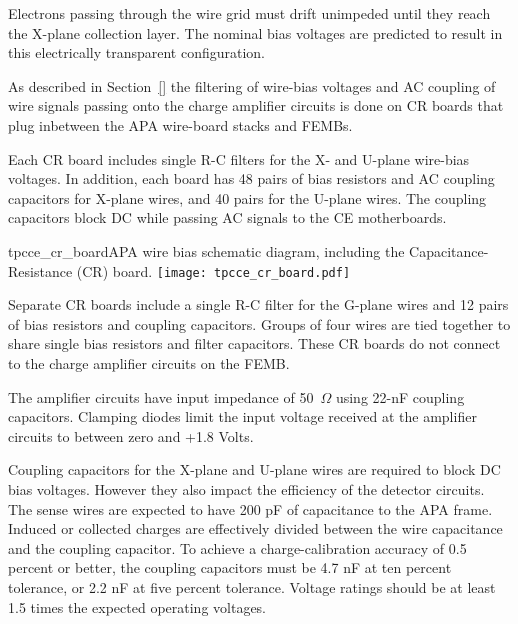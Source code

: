 Electrons passing through the wire grid must drift unimpeded until they reach the X-plane 
collection layer. The nominal bias voltages are predicted to result in this electrically 
transparent configuration.

As described in Section~\ref{}  the filtering of wire-bias voltages and AC coupling of wire signals passing
onto the charge amplifier circuits is done on  CR boards that plug inbetween the APA wire-board stacks and FEMBs.

Each CR board includes single R-C filters for the X- and U-plane wire-bias voltages. In addition, each board has 48 
pairs of bias resistors and AC coupling capacitors for X-plane wires, and 40 pairs for the U-plane wires. The coupling capacitors block DC while passing AC 
signals to the CE motherboards.

\begin{cdrfigure}{tpcce_cr_board}{APA wire bias 
schematic diagram, including the Capacitance-Resistance (CR) board.}
\texttt{[image: tpcce\_cr\_board.pdf]}
\end{cdrfigure}

Separate CR boards include a single R-C filter for the G-plane wires and 12 pairs of bias resistors and
coupling capacitors.
Groups of four wires are tied together to share single
bias resistors and filter capacitors. These CR boards do not connect to the charge amplifier circuits on the FEMB.

The amplifier circuits 
have input impedance of 50~$\Omega$ using 22-nF coupling capacitors. 
Clamping diodes limit the input voltage received at the amplifier circuits to between zero and +1.8 Volts.


Coupling capacitors for the X-plane and U-plane wires are required to block DC bias voltages.
However they also impact the efficiency of the detector circuits.
The sense wires are expected to have 200 pF of capacitance to the APA frame.
Induced or collected charges are effectively divided between the wire capacitance and the coupling capacitor.
To achieve a charge-calibration accuracy of 0.5 percent or better,
the coupling capacitors must be 4.7 nF at ten percent tolerance, or 2.2 nF at five percent tolerance.
Voltage ratings should be at least 1.5 times the expected operating voltages.

